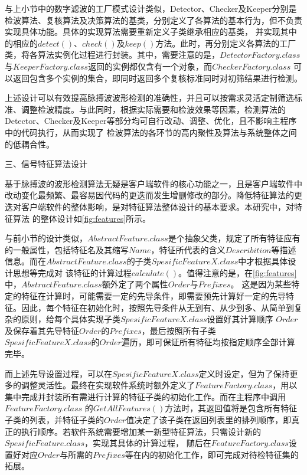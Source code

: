 与上小节中的数字滤波的工厂模式设计类似，Detector、Checker及Keeper分别是检波算法、复核算法及决策算法的基类，分别定义了各算法的基本行为，但不负责实现具体功能。具体的实现算法需要重新定义子类继承相应的基类，
并实现其中的相应的$detect()$、$check()$及$keep()$方法。此时，再分别定义各算法的工厂类，将各算法实例化过程进行封装。其中，需要注意的是，$DetectorFactory.class$与$KeeperFactory.class$返回的实例都仅含有一个对象，而$CheckerFactory.class$
可以返回包含多个实例的集合，即同时返回多个复核标准同时对初筛结果进行检测。

上述设计可以有效提高脉搏波波形检测的准确性，并且可以按需求灵活定制筛选标准、调整检波精度。与此同时，根据实际需要和检波效果等因素，检测算法的Detector、Checker及Keeper等部分均可自行改动、调整、优化，且不影响主程序中的代码执行，从而实现了
检波算法的各环节的高内聚性及算法与系统整体之间的低耦合性。

三、信号特征算法设计

基于脉搏波的波形检测算法无疑是客户端软件的核心功能之一，且是客户端软件中改动变化最频繁、最容易因代码的更迭而发生增删修改的部分。降低特征算法的更迭对客户端软件的整体影响，是对特征算法整体设计的基本要求。本研究中，对特征算法
的整体设计如\autoref{fig:features}所示。

与前小节的设计类似，$AbstractFeature.class$是个抽象父类，规定了所有特征应有的一般属性，包括特征名及其缩写$Name$，特征所代表的含义$Describition$等描述信息。而在$AbstractFeature.class$的子类$SpesificFeatureX.class$中才根据具体设计思想等完成对
该特征的计算过程$calculate()$。值得注意的是，在\autoref{fig:features}中，$AbstractFeature.class$额外定了两个属性$Order$与$Prefixes$。
这是因为某些特定的特征在计算时，可能需要一定的先导条件，即需要预先计算好一定的先导特征。因此，每个特征在初始化时，按照先导条件从无到有、从少到多、从简单到复杂的原则，给每个具体实现子类$SpesificFeatureX.class$设置好其计算顺序
$Order$及保存着其先导特征$Order$的$Prefixes$，最后按照所有子类$SpesificFeatureX.class$的$Order$遍历，即可保证所有特征均按指定顺序全部计算完毕。

而上述先导设置过程，可以在$SpesificFeatureX.class$定义时设定，但为了保持更多的调整灵活性。最终在实现软件系统时额外定义了$FeatureFactory.class$，用以集中完成并封装所有需进行计算的特征子类的初始化工作。而在主程序中调用$FeatureFactory.class$
的$GetAllFeatures()$方法时，其返回值将是包含所有特征子类的列表，并特征子类的$Order$值决定了该子类在返回列表里的排列顺序，即真正的执行顺序。若软件系统需要增加某一新型特征算法，只需设计新的$SpesificFeature.class$，实现其具体的计算过程，
随后在$FeatureFactory.class$设置好对应$Order$与所需的$Prefixes$等在内的初始化工作，即可完成对待检特征集的拓展。

